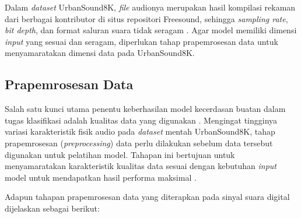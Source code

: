 Dalam \textit{dataset} UrbanSound8K, \textit{file} audionya merupakan hasil kompilasi rekaman dari berbagai kontributor di situs repositori Freesound, sehingga \textit{sampling rate}, \textit{bit depth}, dan format saluran suara tidak seragam \cite{salamon2014dataset}.
Agar model memiliki dimensi \textit{input} yang sesuai dan seragam, diperlukan tahap prapemrosesan data untuk menyamaratakan dimensi data pada UrbanSound8K.

\subsection{Prapemrosesan Data} \label{II.Teori4}
Salah satu kunci utama penentu keberhasilan model kecerdasan buatan dalam tugas klasifikasi adalah kualitas data yang digunakan \cite{han2011data}.
Mengingat tingginya variasi karakteristik fisik audio pada \textit{dataset} mentah UrbanSound8K, tahap prapemrosesan (\textit{preprocessing}) data perlu dilakukan sebelum data tersebut digunakan untuk pelatihan model.
Tahapan ini bertujuan untuk menyamaratakan karakteristik kualitas data sesuai dengan kebutuhan \textit{input} model untuk mendapatkan hasil performa maksimal \cite{han2011data}. \par
Adapun tahapan prapemrosesan data yang diterapkan pada sinyal suara digital dijelaskan sebagai berikut:

